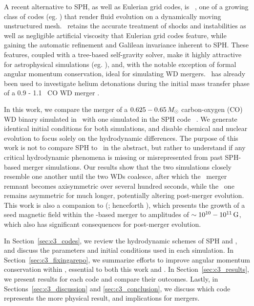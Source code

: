 
A recent alternative to SPH, as well as Eulerian grid codes, is \arepo\ \citep{spri10}, one of a growing class of codes (eg. \citealt{duffm11, gabujl12, vandr16}) that render fluid evolution on a dynamically moving unstructured mesh.  \arepo\ retains the accurate treatment of shocks and instabilities as well as negligible artificial viscosity that Eulerian grid codes feature, while gaining the automatic refinement and Galilean invariance inherent to SPH.  These features, coupled with a tree-based self-gravity solver, make it highly attractive for astrophysical simulations (eg. \citealt{voge+12, pakms13, hayw+14, marips14, ohlm+16}), and, with the notable exception of formal angular momentum conservation, ideal for simulating WD mergers.  \arepo\ has already been used to investigate helium detonations during the initial mass transfer phase of a 0.9 - 1.1 \Msun\ CO WD merger \citep{pakm+13}.

In this work, we compare the merger of a $0.625 - 0.65\,\Msun$ carbon-oxygen (CO) WD binary simulated in \arepo\ with one simulated in the SPH code \gasoline\ \citep{wadssq04}.  We generate identical initial conditions for both simulations, and disable chemical and nuclear evolution to focus solely on the hydrodynamic differences.  The purpose of this work is not to compare SPH to \arepo\ in the abstract, but rather to understand if any critical hydrodynamic phenomena is missing or misrepresented from past SPH-based merger simulations.  Our results show that the two simulations closely resemble one another until the two WDs coalesce, after which the \gasoline\ merger remnant becomes axisymmetric over several hundred seconds, while the \arepo\ one remains asymmetric for much longer, potentially altering post-merger evolution.  This work is also a companion to \citeauthor{zhu+15} (\citeyear{zhu+15}; henceforth \citeal{zhu+15}), which presents the growth of a seed magnetic field within the \arepo-based merger to amplitudes of $\sim10^{10}-10^{11}\,\mathrm{G}$, which also has significant consequences for post-merger evolution.

In Section~\ref{sec:c3_codes}, we review the hydrodynamic schemes of SPH and \arepo, and discuss the parameters and initial conditions used in each simulation.  In Section~\ref{sec:c3_fixingarepo}, we summarize efforts to improve angular momentum conservation within \arepo, essential to both this work and \citeal{zhu+15}.  In Section~\ref{sec:c3_results}, we present results for each code and compare their outcomes.  Lastly, in Sections~\ref{sec:c3_discussion} and \ref{sec:c3_conclusion}, we discuss which code represents the more physical result, and implications for mergers.

